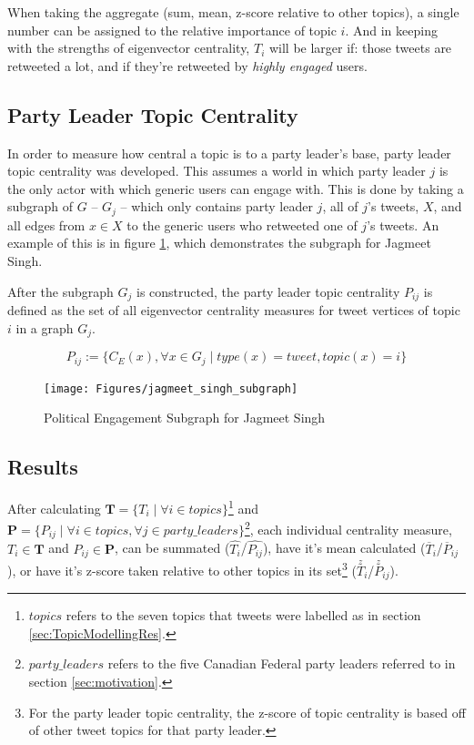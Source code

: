 When taking the aggregate (sum, mean, z-score relative to other topics), a
single number can be assigned to the relative importance of topic $i$. And in
keeping with the strengths of eigenvector centrality, $T_{i}$ will be larger if:
those tweets are retweeted a lot, and if they're retweeted by \emph{highly
engaged} users.

\subsection{Party Leader Topic Centrality}\label{sec:LeaderCentrality}

In order to measure how central a topic is to a party leader's base, party
leader topic centrality was developed. This assumes a world in which party
leader $j$ is the only actor with which generic users can engage with. This is
done by taking a subgraph of $G$ -- $G_{j}$ -- which only contains party leader
$j$, all of $j$'s tweets, $X$, and all edges from $x\in X$ to the generic users
who retweeted one of $j$'s tweets. An example of this is in figure
\ref{fig:jagmeet_singh_subgraph}, which demonstrates the subgraph for Jagmeet
Singh. 

After the subgraph $G_j$ is constructed, the party leader topic
centrality $P_{ij}$ is defined as the set of all eigenvector centrality measures
for tweet vertices of topic $i$ in a graph $G_{j}$.

\begin{equation}
    P_{ij} := \{ C_{E}(x) ,  \forall x \in G_{j} \mid type(x)=tweet, topic(x)=i \}
\end{equation}

\begin{singlespacing}
    \begin{figure}[H]
    \centering
    \texttt{[image: Figures/jagmeet\_singh\_subgraph]}
    \caption[Political Engagement Subgraph for Jagmeet Singh]{Political Engagement Subgraph for Jagmeet Singh}
    \label{fig:jagmeet_singh_subgraph}
    \end{figure}
\end{singlespacing}

\subsection{Results}\label{sec:TopicCentralityResults}

After calculating $\textbf{T}=\{T_{i} \mid \forall i \in
topics\}$\footnote{$topics$ refers to the seven topics that tweets were labelled
as in section \ref{sec:TopicModellingRes}.} and $\textbf{P}=\{P_{ij} \mid
\forall i \in topics,\forall j \in party\_leaders\}$\footnote{$party\_leaders$
refers to the five Canadian Federal party leaders referred to in section
\ref{sec:motivation}.}, each individual centrality measure, $T_{i} \in
\textbf{T}$ and $P_{ij}\in \textbf{P}$, can be summated
($\hat{T_{i}}$/$\hat{P_{ij}}$), have it's mean calculated
($\overline{T}_{i}$/$\overline{P}_{ij}$), or have it's z-score taken relative to
other topics in its set\footnote{For the party leader topic centrality, the
z-score of topic centrality is based off of other tweet topics for that party
leader.} ($\stackrel{z}{T}_{i}$/$\stackrel{z}{P}_{ij}$).

